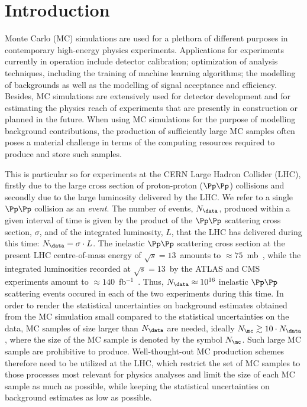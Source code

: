 \section{Introduction}
\label{sec:introduction}

Monte Carlo (MC) simulations are used for a plethora of different purposes in contemporary high-energy physics experiments.
Applications for experiments currently in operation include detector calibration; optimization of analysis techniques, including the training of machine learning algorithms;
the modelling of backgrounds as well as the modelling of signal acceptance and efficiency.
Besides, MC simulations are extensively used for detector development and for estimating the physics reach of experiments that are presently in construction or planned in the future.
When using MC simulations for the purpose of modelling background contributions,
the production of sufficiently large MC samples often poses a material challenge in terms of the computing resources required to produce and store such samples.

This is particular so for experiments at the CERN Large Hadron Collider (LHC),
firstly due to the large cross section of proton-proton ($\Pp\Pp$) collisions and secondly due to the large luminosity delivered by the LHC.
We refer to a single $\Pp\Pp$ collision as an {\em event}.
The number of events, $N_{\data}$, produced within a given interval of time 
is given by the product of the $\Pp\Pp$ scattering cross section, $\sigma$, and of the integrated luminosity, $L$, that the LHC has delivered during this time:
$N_{\data} = \sigma \cdot L$.
The inelastic $\Pp\Pp$ scattering cross section at the present LHC centre-of-mass energy of $\sqrt{s}=13$~\TeV amounts to $\approx 75$~mb~\cite{Aaboud:2016mmw,Sirunyan:2018nqx},
while the integrated luminosities recorded at $\sqrt{s}=13$~\TeV by the ATLAS and CMS experiments amount to $\approx 140$~fb$^{-1}$~\cite{ATLAS-CONF-2019-021,LUM-17-001,LUM-17-004,LUM-18-002}.
Thus, $N_{\data} \approx 10^{16}$ inelastic $\Pp\Pp$ scattering events occured in each of the two experiments during this time.
In order to render the statistical uncertainties on background estimates obtained from the MC simulation small compared to the statistical uncertainties on the data,
MC samples of size larger than $N_{\data}$ are needed, ideally $N_{\mc} \gtrsim 10 \cdot N_{\data}$,
where the size of the MC sample is denoted by the symbol $N_{\mc}$.
Such large MC sample are prohibitive to produce.
Well-thought-out MC production schemes therefore need to be utilized at the LHC,
which restrict the set of MC samples to those processes most relevant for physics analyses
and limit the size of each MC sample as much as possible, 
while keeping the statistical uncertainties on background estimates as low as possible.



